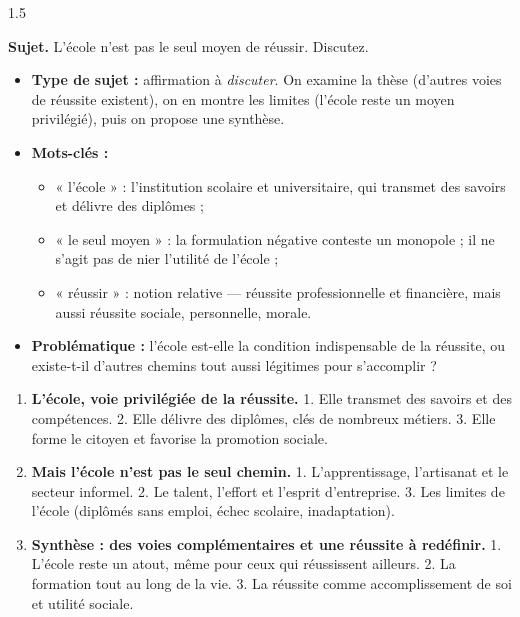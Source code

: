 \documentclass[12pt]{article}
\begin{document}
\begin{spacing}{1.5}

\noindent\textbf{Sujet.} L'école n'est pas le seul moyen de réussir. Discutez.


\begin{itemize}
\item \textbf{Type de sujet :} affirmation à \emph{discuter}. On examine la thèse (d'autres voies de réussite existent), on en montre les limites (l'école reste un moyen privilégié), puis on propose une synthèse.
\item \textbf{Mots-clés :}
  \begin{itemize}
  \item « l'école » : l'institution scolaire et universitaire, qui transmet des savoirs et délivre des diplômes ;
  \item « le seul moyen » : la formulation négative conteste un monopole ; il ne s'agit pas de nier l'utilité de l'école ;
  \item « réussir » : notion relative — réussite professionnelle et financière, mais aussi réussite sociale, personnelle, morale.
  \end{itemize}
\item \textbf{Problématique :} l'école est-elle la condition indispensable de la réussite, ou existe-t-il d'autres chemins tout aussi légitimes pour s'accomplir ?
\end{itemize}


\begin{enumerate}
\item[I.] \textbf{L'école, voie privilégiée de la réussite.} 1. Elle transmet des savoirs et des compétences. 2. Elle délivre des diplômes, clés de nombreux métiers. 3. Elle forme le citoyen et favorise la promotion sociale.
\item[II.] \textbf{Mais l'école n'est pas le seul chemin.} 1. L'apprentissage, l'artisanat et le secteur informel. 2. Le talent, l'effort et l'esprit d'entreprise. 3. Les limites de l'école (diplômés sans emploi, échec scolaire, inadaptation).
\item[III.] \textbf{Synthèse : des voies complémentaires et une réussite à redéfinir.} 1. L'école reste un atout, même pour ceux qui réussissent ailleurs. 2. La formation tout au long de la vie. 3. La réussite comme accomplissement de soi et utilité sociale.
\end{enumerate}


\end{spacing}
\end{document}
